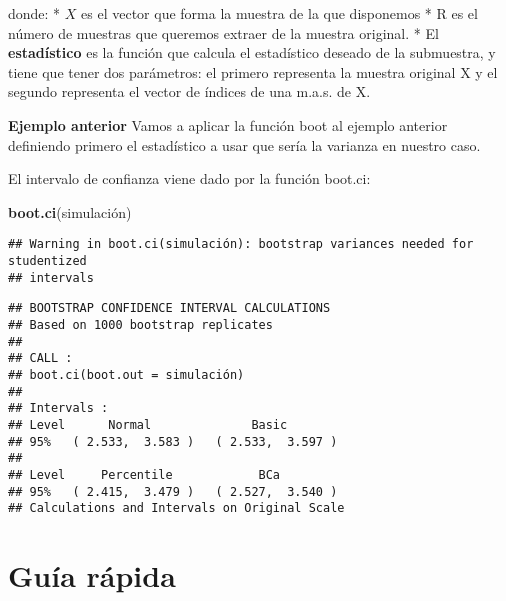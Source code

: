 \documentclass[
]{article}
\newenvironment{Shaded}{\begin{snugshade}}{\end{snugshade}}
\newcommand{\ControlFlowTok}[1]{\textcolor[rgb]{0.13,0.29,0.53}{\textbf{#1}}}
\newcommand{\DecValTok}[1]{\textcolor[rgb]{0.00,0.00,0.81}{#1}}
\newcommand{\KeywordTok}[1]{\textcolor[rgb]{0.13,0.29,0.53}{\textbf{#1}}}
\newcommand{\NormalTok}[1]{#1}
\newcommand{\OperatorTok}[1]{\textcolor[rgb]{0.81,0.36,0.00}{\textbf{#1}}}
\begin{document}
donde: * \(X\) es el vector que forma la muestra de la que disponemos *
R es el número de muestras que queremos extraer de la muestra original.
* El \textbf{estadístico} es la función que calcula el estadístico
deseado de la submuestra, y tiene que tener dos parámetros: el primero
representa la muestra original X y el segundo representa el vector de
índices de una m.a.s. de X.

\textbf{Ejemplo anterior} Vamos a aplicar la función boot al ejemplo
anterior definiendo primero el estadístico a usar que sería la varianza
en nuestro caso.

\begin{Shaded}
\end{Shaded}

El intervalo de confianza viene dado por la función boot.ci:

\begin{Shaded}
\begin{Highlighting}[]
\KeywordTok{boot.ci}\NormalTok{(simulación)}
\end{Highlighting}
\end{Shaded}

\begin{verbatim}
## Warning in boot.ci(simulación): bootstrap variances needed for studentized
## intervals
\end{verbatim}

\begin{verbatim}
## BOOTSTRAP CONFIDENCE INTERVAL CALCULATIONS
## Based on 1000 bootstrap replicates
## 
## CALL : 
## boot.ci(boot.out = simulación)
## 
## Intervals : 
## Level      Normal              Basic         
## 95%   ( 2.533,  3.583 )   ( 2.533,  3.597 )  
## 
## Level     Percentile            BCa          
## 95%   ( 2.415,  3.479 )   ( 2.527,  3.540 )  
## Calculations and Intervals on Original Scale
\end{verbatim}

\hypertarget{guuxeda-ruxe1pida}{%
\section{Guía rápida}\label{guuxeda-ruxe1pida}}
\end{document}
